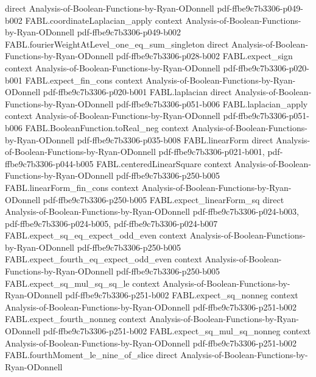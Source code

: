 \begin{theorem}
  {direct}
  {Analysis-of-Boolean-Functions-by-Ryan-ODonnell}
  {pdf-ffbe9c7b3306-p049-b002}
\proofstep
  {FABL.coordinateLaplacian_apply}
  {context}
  {Analysis-of-Boolean-Functions-by-Ryan-ODonnell}
  {pdf-ffbe9c7b3306-p049-b002}
\proofstep
  {FABL.fourierWeightAtLevel_one_eq_sum_singleton}
  {direct}
  {Analysis-of-Boolean-Functions-by-Ryan-ODonnell}
  {pdf-ffbe9c7b3306-p028-b002}
\proofstep
  {FABL.expect_sign}
  {context}
  {Analysis-of-Boolean-Functions-by-Ryan-ODonnell}
  {pdf-ffbe9c7b3306-p020-b001}
\proofstep
  {FABL.expect_fin_cons}
  {context}
  {Analysis-of-Boolean-Functions-by-Ryan-ODonnell}
  {pdf-ffbe9c7b3306-p020-b001}
\proofstep
  {FABL.laplacian}
  {direct}
  {Analysis-of-Boolean-Functions-by-Ryan-ODonnell}
  {pdf-ffbe9c7b3306-p051-b006}
\proofstep
  {FABL.laplacian_apply}
  {context}
  {Analysis-of-Boolean-Functions-by-Ryan-ODonnell}
  {pdf-ffbe9c7b3306-p051-b006}
\proofstep
  {FABL.BooleanFunction.toReal_neg}
  {context}
  {Analysis-of-Boolean-Functions-by-Ryan-ODonnell}
  {pdf-ffbe9c7b3306-p035-b008}
\proofstep
  {FABL.linearForm}
  {direct}
  {Analysis-of-Boolean-Functions-by-Ryan-ODonnell}
  {pdf-ffbe9c7b3306-p021-b001,
    pdf-ffbe9c7b3306-p044-b005}
\proofstep
  {FABL.centeredLinearSquare}
  {context}
  {Analysis-of-Boolean-Functions-by-Ryan-ODonnell}
  {pdf-ffbe9c7b3306-p250-b005}
\proofstep
  {FABL.linearForm_fin_cons}
  {context}
  {Analysis-of-Boolean-Functions-by-Ryan-ODonnell}
  {pdf-ffbe9c7b3306-p250-b005}
\proofstep
  {FABL.expect_linearForm_sq}
  {direct}
  {Analysis-of-Boolean-Functions-by-Ryan-ODonnell}
  {pdf-ffbe9c7b3306-p024-b003,
    pdf-ffbe9c7b3306-p024-b005,
    pdf-ffbe9c7b3306-p024-b007}
\proofstep
  {FABL.expect_sq_eq_expect_odd_even}
  {context}
  {Analysis-of-Boolean-Functions-by-Ryan-ODonnell}
  {pdf-ffbe9c7b3306-p250-b005}
\proofstep
  {FABL.expect_fourth_eq_expect_odd_even}
  {context}
  {Analysis-of-Boolean-Functions-by-Ryan-ODonnell}
  {pdf-ffbe9c7b3306-p250-b005}
\proofstep
  {FABL.expect_sq_mul_sq_sq_le}
  {context}
  {Analysis-of-Boolean-Functions-by-Ryan-ODonnell}
  {pdf-ffbe9c7b3306-p251-b002}
\proofstep
  {FABL.expect_sq_nonneg}
  {context}
  {Analysis-of-Boolean-Functions-by-Ryan-ODonnell}
  {pdf-ffbe9c7b3306-p251-b002}
\proofstep
  {FABL.expect_fourth_nonneg}
  {context}
  {Analysis-of-Boolean-Functions-by-Ryan-ODonnell}
  {pdf-ffbe9c7b3306-p251-b002}
\proofstep
  {FABL.expect_sq_mul_sq_nonneg}
  {context}
  {Analysis-of-Boolean-Functions-by-Ryan-ODonnell}
  {pdf-ffbe9c7b3306-p251-b002}
\proofstep
  {FABL.fourthMoment_le_nine_of_slice}
  {direct}
  {Analysis-of-Boolean-Functions-by-Ryan-ODonnell}

\end{theorem}
